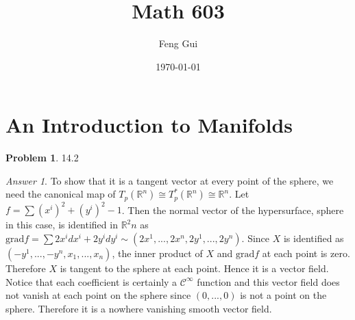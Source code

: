 \documentclass[10pt,a4paper]{article}
\theoremstyle{plain}
\theoremstyle{definition}
\newtheorem*{problem*}{Problem}
\theoremstyle{remark}
\newtheorem*{answer*}{Answer}
\newcommand{\sC}{\mathcal{C}}
\newcommand{\IR}{\mathbb{R}}
\newcommand{\<}{\langle}
\renewcommand{\>}{\rangle}
\newcommand{\isom}{\cong}
\newcommand{\subtitle}[1]{%
  \posttitle{%
    \par\end{center}
    \begin{center}\large#1\end{center}
    \vskip0.5em}%
}
\begin{document}
%

\title{Math 603}
\subtitle{Homework 6}
\author{Feng Gui}
\date{\today}



\pagestyle{plain}

\makeatletter
\let\runlhead\@author
\let\runrhead\@title
\makeatother

\renewcommand{\headrulewidth}{1.5pt}
\lhead{\runlhead} %
\chead{}
\rhead{\runrhead}

\lfoot{}
\cfoot{}


\maketitle


\section*{An Introduction to Manifolds}

\begin{problem*} 14.2
\end{problem*}

\begin{answer*} \hfill

To show that it is a tangent vector at every point of the sphere, we need the canonical map of $T_p(\IR^n) \isom T_p^*(\IR^n) \isom \IR^n$. Let $f = \sum (x^i)^2 + (y^i)^2 -1$. Then the normal vector of the hypersurface, sphere in this case, is identified in $\IR^2n$ as $\mathrm{grad} f = \sum 2x^i dx^i + 2y^idy^i \sim (2x^1,...,2x^n,2y^1,...,2y^n)$. Since $X$ is identified as $(-y^1,...,-y^n,x_1,...,x_n)$, the inner product of $X$ and $\mathrm{grad} f$ at  each point is zero. Therefore $X$ is tangent to the sphere at each point. Hence it is a vector field. Notice that each coefficient is certainly a $\sC^\infty$ function and this vector field does not vanish at each point on the sphere since $(0,...,0)$ is not a point on the sphere. Therefore it is a nowhere vanishing smooth vector field. \\

\end{answer*}
\end{document}
